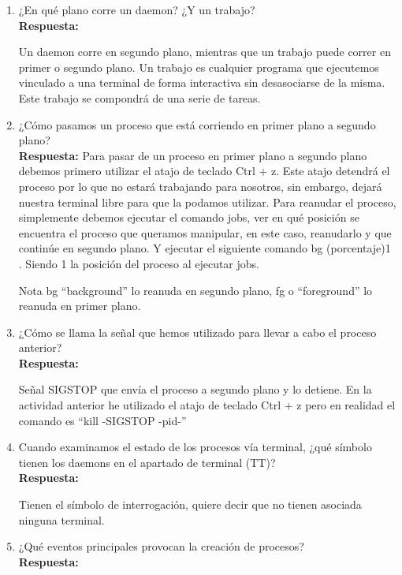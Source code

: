 \documentclass[a4paper,12pt]{article}
\begin{document}
\begin{enumerate}[label=\textbf{Pregunta \arabic*.}]
    \item ¿En qué plano corre un daemon? ¿Y un trabajo? \\ %
    \textbf{Respuesta:} 
    
    Un daemon corre en segundo plano, mientras que un trabajo puede correr en primer o segundo plano. Un trabajo es cualquier programa que ejecutemos vinculado a una terminal de forma interactiva sin desasociarse de la misma. Este trabajo se compondrá de una serie de tareas. 


    \item ¿Cómo pasamos un proceso que está corriendo en primer plano a segundo plano? \\ %
    \textbf{Respuesta:} 
    Para pasar de un proceso en primer plano a segundo plano debemos primero utilizar el atajo de teclado Ctrl + z. Este atajo detendrá el proceso por lo que no estará trabajando para nosotros, sin embargo, dejará nuestra terminal libre para que la podamos utilizar. Para reanudar el proceso, simplemente debemos ejecutar el comando jobs, ver en qué posición se encuentra el proceso que queramos manipular, en este caso, reanudarlo y que continúe en segundo plano. Y ejecutar el siguiente comando bg (porcentaje)1 . Siendo 1 la posición del proceso al ejecutar jobs.


    Nota bg “background” lo reanuda en segundo plano, fg o “foreground” lo reanuda en primer plano.


    \item ¿Cómo se llama la señal que hemos utilizado para llevar a cabo el proceso anterior? \\
    \textbf{Respuesta:} %

    Señal SIGSTOP que envía el proceso a segundo plano y lo detiene. En la actividad anterior he utilizado el atajo de teclado Ctrl + z pero en realidad el comando es “kill -SIGSTOP -pid-”



    \item Cuando examinamos el estado de los procesos vía terminal, ¿qué símbolo tienen los daemons en el apartado de terminal (TT)? \\
    \textbf{Respuesta:}

    Tienen el símbolo de interrogación, quiere decir que no tienen asociada ninguna terminal.



    \item ¿Qué eventos principales provocan la creación de procesos? \\
    \textbf{Respuesta:}


\end{enumerate}
\end{document}
